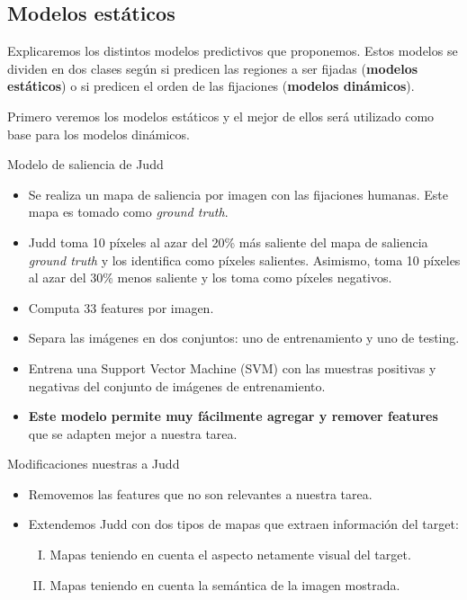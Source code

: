 \documentclass[compress]{beamer}
\begin{document}
\subsection{Modelos estáticos}

\begin{frame}
Explicaremos los distintos modelos predictivos que proponemos. Estos modelos se dividen en dos clases según si predicen las regiones a ser fijadas (\textbf{modelos estáticos}) o si predicen el orden de las fijaciones (\textbf{modelos dinámicos}).

\bigskip

Primero veremos los modelos estáticos y el mejor de ellos será utilizado como base para los modelos dinámicos.
\end{frame}

\begin{frame}{Modelo de saliencia de Judd}
\begin{itemize}
\item Se realiza un mapa de saliencia por imagen con las fijaciones humanas. Este mapa es tomado como \textit{ground truth}.
\item Judd toma 10 píxeles al azar del 20\% más saliente del mapa de saliencia \textit{ground truth} y los identifica como píxeles salientes. Asimismo, toma 10 píxeles al azar del 30\% menos saliente y los toma como píxeles negativos.
\item Computa 33 features por imagen.
\item Separa las imágenes en dos conjuntos: uno de entrenamiento y uno de testing. 
\item Entrena una Support Vector Machine (SVM) con las muestras positivas y negativas del conjunto de imágenes de entrenamiento.
\item \textbf{Este modelo permite muy fácilmente agregar y remover features} que se adapten mejor a nuestra tarea.
\end{itemize}
\end{frame}

\begin{frame}{Modificaciones nuestras a Judd}
\begin{itemize}
\item Removemos las features que no son relevantes a nuestra tarea.
\bigskip
\item Extendemos Judd con dos tipos de mapas que extraen información del target:
\begin{enumerate}[I.]
\item Mapas teniendo en cuenta el aspecto netamente visual del target.
\item Mapas teniendo en cuenta la semántica de la imagen mostrada.
\end{enumerate}
\end{itemize}
\end{frame}
\end{document}
